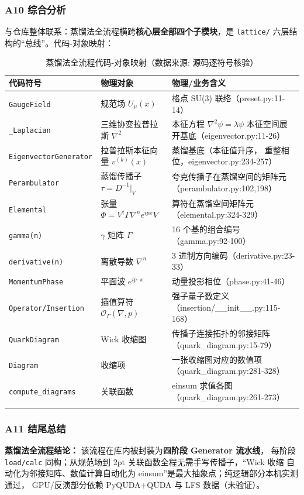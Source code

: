 \documentclass[UTF8]{ctexart}
\begin{document}
\subsubsection{A10 综合分析}
与仓库整体联系：蒸馏法全流程横跨\textbf{核心层全部四个子模块}，是 \texttt{lattice/}
六层结构的``总线''。代码-对象映射：
\begin{xltabular}{\textwidth}{llX}
\toprule
\textcolor{struct}{代码符号} & \textcolor{struct}{物理对象} & 物理/业务含义 \\
\midrule
\endhead
\texttt{GaugeField} & 规范场 $U_\mu(x)$ & 格点 SU(3) 联络（preset.py:11-14） \\
\texttt{\_Laplacian} & 三维协变拉普拉斯 $\nabla^2$ & 本征方程 $\nabla^2\psi=\lambda\psi$
本征空间展开基底（eigenvector.py:11-26） \\
\texttt{EigenvectorGenerator} & 拉普拉斯本征向量 $v^{(k)}(x)$ & 蒸馏基底（本征值升序，
重整相位，eigenvector.py:234-257） \\
\texttt{Perambulator} & 蒸馏传播子 $\tau=D^{-1}|_{V}$ & 夸克传播子在蒸馏空间的矩阵元
（perambulator.py:102,198） \\
\texttt{Elemental} & 张量 $\Phi=V^\dagger\Gamma\nabla^n e^{ipx} V$ & 算符在蒸馏空间矩阵元
（elemental.py:324-329） \\
\texttt{gamma(n)} & $\gamma$ 矩阵 $\Gamma$ & 16 个基的组合编号（gamma.py:92-100） \\
\texttt{derivative(n)} & 离散导数 $\nabla^n$ & 3 进制方向编码（derivative.py:23-33） \\
\texttt{MomentumPhase} & 平面波 $e^{ip\cdot x}$ & 动量投影相位（phase.py:41-46） \\
\texttt{Operator/Insertion} & 插值算符 $\mathcal O_\Gamma(\nabla,p)$ & 强子量子数定义
（insertion/\_\_init\_\_.py:115-168） \\
\texttt{QuarkDiagram} & Wick 收缩图 & 传播子连接拓扑的邻接矩阵（quark\_diagram.py:15-79） \\
\texttt{Diagram} & 收缩项 & 一张收缩图对应的数值项（quark\_diagram.py:281-328） \\
\texttt{compute\_diagrams} & 关联函数 & einsum 求值各图（quark\_diagram.py:261-273） \\
\bottomrule
\caption{蒸馏法全流程代码-对象映射（数据来源: 源码逐符号核验）}
\end{xltabular}

\subsubsection{A11 结尾总结}
\begin{conclbox}
\textbf{蒸馏法全流程结论：} 该流程在库内被封装为\textbf{四阶段 Generator 流水线}，
每阶段 \texttt{load/calc} 同构；从规范场到 2pt 关联函数全程无需手写传播子，``Wick 收缩
自动化为邻接矩阵、数值计算自动化为 einsum''是最大抽象点；纯逻辑部分本机实测通过，
GPU/反演部分依赖 PyQUDA+QUDA 与 LFS 数据（未验证）。
\end{conclbox}
\end{document}
